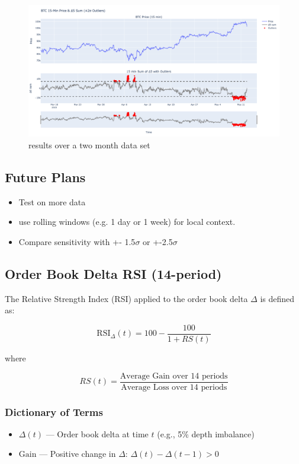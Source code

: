 \documentclass[12pt]{article}
\begin{document}
\begin{figure}
    \centering
    \includegraphics[width=1\textwidth]{imgs/ResultsOfSTDoutlierDecection.png}
    \caption{results over a two month data set}
\end{figure}


\subsection*{Future Plans}

\begin{itemize}
    \item Test on more data
    \item use rolling windows (e.g. 1 day or 1 week) for local context.
    \item Compare sensitivity with +- 1.5$\sigma$ or +-2.5$\sigma$
\end{itemize}

\newpage

\subsection*{Order Book Delta RSI (14-period)}

The Relative Strength Index (RSI) applied to the order book delta $\Delta$ is defined as:

\[
\text{RSI}_{\Delta}(t) = 100 - \frac{100}{1 + RS(t)}
\]

where

\[
RS(t) = \frac{\text{Average Gain over 14 periods}}{\text{Average Loss over 14 periods}}
\]


\subsubsection*{Dictionary of Terms}

\begin{itemize}
  \item $\Delta(t)$ — Order book delta at time $t$ (e.g., 5\% depth imbalance)
  \item $\text{Gain}$ — Positive change in $\Delta$: $\Delta(t) - \Delta(t-1) > 0$

\end{itemize}
\end{document}
